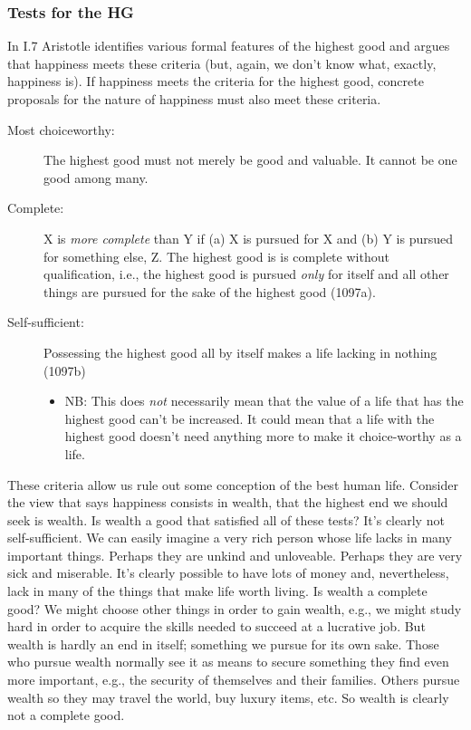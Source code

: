 \documentclass[oneside]{article}
\begin{document}
\subsubsection*{Tests for the HG }

In I.7 Aristotle identifies various formal features of the highest good and argues that happiness meets these criteria (but, again, we don't know what, exactly, happiness is). If happiness meets the criteria for the highest good, concrete proposals for the nature of happiness must also meet these criteria. 

\begin{description}
\item[Most choiceworthy:] The highest good must not merely be good and valuable. It cannot be one good among many.
\item[Complete:]  X is \emph{more complete} than Y if (a) X is pursued for X and (b) Y is pursued for something else, Z. The highest good is is complete without qualification, i.e., the highest good is pursued \emph{only} for itself and all other things are pursued for the sake of the highest good (1097a).
\item[Self-sufficient:] Possessing the highest good all by itself makes a life lacking in nothing (1097b)
\begin{itemize}
\item NB: This does \emph{not} necessarily mean that the value of a life that has the highest good can't be increased. It could mean that a life with the highest good doesn't need anything more to make it choice-worthy as a life.
\end{itemize}
\end{description}

These criteria allow us rule out some conception of the best human life. Consider the view that says happiness consists in wealth, that the highest end we should seek is wealth. Is wealth a good that satisfied all of these tests? It's clearly not self-sufficient. We can easily imagine a very rich person whose life lacks in many important things. Perhaps they are unkind and unloveable. Perhaps they are very sick and miserable. It's clearly possible to have lots of money and, nevertheless, lack in many of the things that make life worth living. Is wealth a complete good? We might choose other things in order to gain wealth, e.g., we might study hard in order to acquire the skills needed to succeed at a lucrative job. But wealth is hardly an end in itself; something we pursue for its own sake. Those who pursue wealth normally see it as means to secure something they find even more important, e.g., the security of themselves and their families. Others pursue wealth so they may travel the world, buy luxury items, etc. So wealth is clearly not a complete good. 
\end{document}
